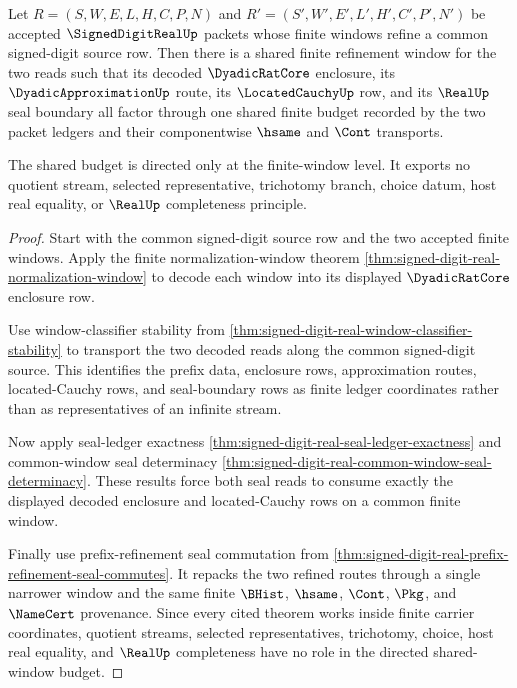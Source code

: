 \begin{theorem}
\label{thm:signed-digit-real-window-refinement-directedness}
Let $R=(S,W,E,L,H,C,P,N)$ and $R'=(S',W',E',L',H',C',P',N')$ be accepted $\SignedDigitRealUp$ packets whose finite windows refine a common signed-digit source row. Then there is a shared finite refinement window for the two reads such that its decoded $\DyadicRatCore$ enclosure, its $\DyadicApproximationUp$ route, its $\LocatedCauchyUp$ row, and its $\RealUp$ seal boundary all factor through one shared finite budget recorded by the two packet ledgers and their componentwise $\hsame$ and $\Cont$ transports.

The shared budget is directed only at the finite-window level. It exports no quotient stream, selected representative, trichotomy branch, choice datum, host real equality, or $\RealUp$ completeness principle.
\end{theorem}
\begin{proof}
Start with the common signed-digit source row and the two accepted finite windows. Apply the finite normalization-window theorem \autoref{thm:signed-digit-real-normalization-window} to decode each window into its displayed $\DyadicRatCore$ enclosure row.

Use window-classifier stability from \autoref{thm:signed-digit-real-window-classifier-stability} to transport the two decoded reads along the common signed-digit source. This identifies the prefix data, enclosure rows, approximation routes, located-Cauchy rows, and seal-boundary rows as finite ledger coordinates rather than as representatives of an infinite stream.

Now apply seal-ledger exactness \autoref{thm:signed-digit-real-seal-ledger-exactness} and common-window seal determinacy \autoref{thm:signed-digit-real-common-window-seal-determinacy}. These results force both seal reads to consume exactly the displayed decoded enclosure and located-Cauchy rows on a common finite window.

Finally use prefix-refinement seal commutation from \autoref{thm:signed-digit-real-prefix-refinement-seal-commutes}. It repacks the two refined routes through a single narrower window and the same finite $\BHist$, $\hsame$, $\Cont$, $\Pkg$, and $\NameCert$ provenance. Since every cited theorem works inside finite carrier coordinates, quotient streams, selected representatives, trichotomy, choice, host real equality, and $\RealUp$ completeness have no role in the directed shared-window budget.
\end{proof}

